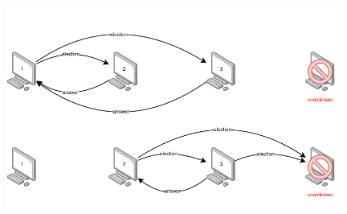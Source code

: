 \documentclass{article}
\begin{document}
\begin{center}
	\includegraphics[width=11cm, height=20cm, keepaspectratio]{assets/bully-1.pdf}
\end{center}
\end{document}
